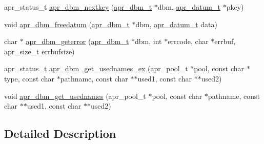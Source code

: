 \begin{DoxyCompactItemize}
\item 
apr\-\_\-status\-\_\-t \hyperlink{group___a_p_r___util___d_b_m_ga92b8233ccf421b89d2144f834dd6f9a6}{apr\-\_\-dbm\-\_\-nextkey} (\hyperlink{structapr__dbm__t}{apr\-\_\-dbm\-\_\-t} $\ast$dbm, \hyperlink{structapr__datum__t}{apr\-\_\-datum\-\_\-t} $\ast$pkey)
\item 
void \hyperlink{group___a_p_r___util___d_b_m_gacd9f6bc4a633720ac882daba9e0d9873}{apr\-\_\-dbm\-\_\-freedatum} (\hyperlink{structapr__dbm__t}{apr\-\_\-dbm\-\_\-t} $\ast$dbm, \hyperlink{structapr__datum__t}{apr\-\_\-datum\-\_\-t} data)
\item 
char $\ast$ \hyperlink{group___a_p_r___util___d_b_m_ga597bd9e35de9575afb55b3326789c0f3}{apr\-\_\-dbm\-\_\-geterror} (\hyperlink{structapr__dbm__t}{apr\-\_\-dbm\-\_\-t} $\ast$dbm, int $\ast$errcode, char $\ast$errbuf, apr\-\_\-size\-\_\-t errbufsize)
\item 
apr\-\_\-status\-\_\-t \hyperlink{group___a_p_r___util___d_b_m_ga7a3a1bd1ece38d90739ecb7cf72bf4fb}{apr\-\_\-dbm\-\_\-get\-\_\-usednames\-\_\-ex} (apr\-\_\-pool\-\_\-t $\ast$pool, const char $\ast$type, const char $\ast$pathname, const char $\ast$$\ast$used1, const char $\ast$$\ast$used2)
\item 
void \hyperlink{group___a_p_r___util___d_b_m_ga1ee45897c5e1b0718dfa4bd35a75dbe1}{apr\-\_\-dbm\-\_\-get\-\_\-usednames} (apr\-\_\-pool\-\_\-t $\ast$pool, const char $\ast$pathname, const char $\ast$$\ast$used1, const char $\ast$$\ast$used2)
\end{DoxyCompactItemize}


\subsection{Detailed Description}


